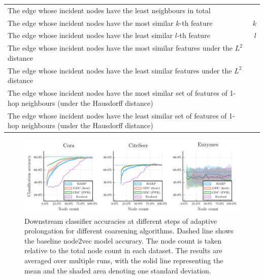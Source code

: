\begin{table}
\begin{center}
\begin{minipage}{\textwidth}
\begin{tabularx}{\textwidth}{Xr}
        The edge whose incident nodes have the least neighbours in total                                                        &                        \\
        The edge whose incident nodes have the most similar \( k \)-th feature                                                  & \( k \)                \\
        The edge whose incident nodes have the least similar \( l \)-th feature                                                 & \( l \)                \\
        The edge whose incident nodes have the most similar features under the \( L^2 \) distance                               &                        \\
        The edge whose incident nodes have the least similar features under the \( L^2 \) distance                              &                        \\
        The edge whose incident nodes have the most similar set of features of 1-hop neighbours (under the Hausdorff distance)  &                        \\
        The edge whose incident nodes have the least similar set of features of 1-hop neighbours (under the Hausdorff distance) &                        \\
        \bottomrule
      \end{tabularx}
    \end{minipage}
  \end{center}
\end{table}

\begin{figure}
  \centering
  \includegraphics[width=\linewidth]{images/coarsening-algorithms/coarsening-algorithms.pdf}
  \caption{Downstream classifier accuracies at different steps of adaptive prolongation for different coarsening algorithms. Dashed line shows the baseline node2vec model accuracy. The node count is taken relative to the total node count in each dataset. The results are averaged over multiple runs, with the solid line representing the mean and the shaded area denoting one standard deviation.}
  \label{fig:coarsening-algorithms}
\end{figure}

